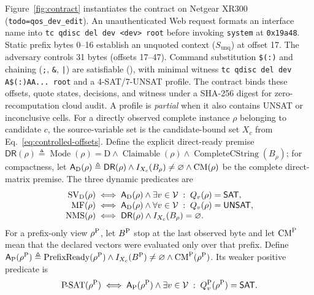 Figure~\ref{fig:contract} instantiates the contract on Netgear XR300 (\texttt{todo=qos\_dev\_edit}). An unauthenticated Web request formats an interface name into \texttt{tc qdisc del dev <dev> root} before invoking \texttt{system} at \texttt{0x19a48}. Static prefix bytes 0--16 establish an unquoted context ($S_{\mathrm{unq}}$) at offset 17. The adversary controls 31 bytes (offsets 17--47). Command substitution \texttt{\$(\!:\!)} and chaining (\texttt{;}, \texttt{\&}, \texttt{|}) are satisfiable (\svsat), with minimal witness \texttt{tc qdisc del dev A\$(\!:\!)AA... root} and a 4-SAT/7-UNSAT profile. The contract binds these offsets, quote states, decisions, and witness under a SHA-256 digest for zero-recomputation cloud audit. A \svsat profile is \emph{partial} when it also contains UNSAT or inconclusive cells.
For a directly observed complete instance $\rho$ belonging to candidate $c$, the
source-variable set is the candidate-bound set $X_c$ from
Eq.~\ref{eq:controlled-offsets}. Define the explicit direct-ready premise
$\mathsf{DR}(\rho)\triangleq\operatorname{Mode}(\rho)=\mathrm D\land
\operatorname{Claimable}(\rho)\land\operatorname{CompleteCString}(B_\rho)$;
for compactness, let
$\mathsf{A}_{\rm D}(\rho)\triangleq\mathsf{DR}(\rho)\land
I_{X_c}(B_\rho)\neq\varnothing\land\operatorname{CM}(\rho)$ be the
complete direct-matrix premise. The three dynamic predicates are
\begin{equation}
\begin{aligned}
\operatorname{SV}_{\rm D}(\rho)&\iff\mathsf{A}_{\rm D}(\rho)\land
  \exists v\in\mathcal V\;:\;Q_v(\rho)=\mathsf{SAT},\\[-1mm]
\operatorname{MF}(\rho)&\iff\mathsf{A}_{\rm D}(\rho)\land
  \forall v\in\mathcal V\;:\;Q_v(\rho)=\mathsf{UNSAT},\\[-1mm]
\operatorname{NMS}(\rho)&\iff \mathsf{DR}(\rho)\land
  I_{X_c}(B_\rho)=\varnothing.
\end{aligned}
\label{eq:instance-classes}
\end{equation}
For a prefix-only view $\rho^{\rm P}$, let $B^{\rm P}$ stop at the last
observed byte and let $\operatorname{CM}^{\rm P}$ mean that the declared
vectors were evaluated only over that prefix. Define
$\mathsf A_{\rm P}(\rho^{\rm P})\triangleq\operatorname{PrefixReady}(\rho^{\rm P})
\land I_{X_c}(B^{\rm P})\neq\varnothing\land\operatorname{CM}^{\rm P}(\rho^{\rm P})$.
Its weaker positive predicate is
\begin{equation}
\operatorname{P\!\text{-}SAT}(\rho^{\rm P})\iff
\mathsf A_{\rm P}(\rho^{\rm P})\land
\exists v\in\mathcal V\;:\;Q_v^{\rm P}(\rho^{\rm P})=\mathsf{SAT}.
\label{eq:prefix-class}
\end{equation}
